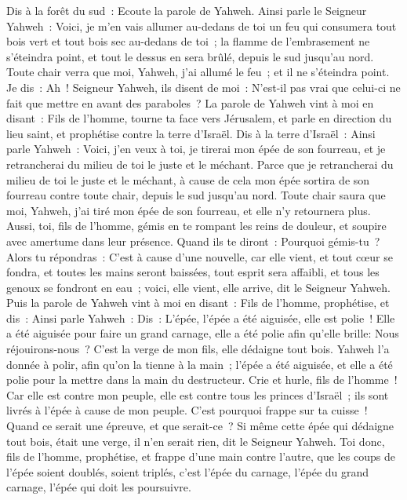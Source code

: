 \begin{multicols}{2}
Dis à la forêt du sud~: Ecoute la parole de Yahweh. Ainsi parle le Seigneur Yahweh~: Voici, je m'en vais allumer au-dedans de toi un feu qui consumera tout bois vert et tout bois sec au-dedans de toi~; la flamme de l'embrasement ne s'éteindra point, et tout le dessus en sera brûlé, depuis le sud jusqu'au nord.
Toute chair verra que moi, Yahweh, j'ai allumé le feu~; et il ne s'éteindra point.
Je dis~: Ah~! Seigneur Yahweh, ils disent de moi~: N'est-il pas vrai que celui-ci ne fait que mettre en avant des paraboles~?
La parole de Yahweh vint à moi en disant~:
Fils de l'homme, tourne ta face vers Jérusalem, et parle en direction du lieu saint, et prophétise contre la terre d'Israël.
Dis à la terre d'Israël~: Ainsi parle Yahweh~: Voici, j'en veux à toi, je tirerai mon épée de son fourreau, et je retrancherai du milieu de toi le juste et le méchant.
Parce que je retrancherai du milieu de toi le juste et le méchant, à cause de cela mon épée sortira de son fourreau contre toute chair, depuis le sud jusqu'au nord.
Toute chair saura que moi, Yahweh, j'ai tiré mon épée de son fourreau, et elle n'y retournera plus.
Aussi, toi, fils de l'homme, gémis en te rompant les reins de douleur, et soupire avec amertume dans leur présence.
Quand ils te diront~: Pourquoi gémis-tu~? Alors tu répondras~: C'est à cause d'une nouvelle, car elle vient, et tout cœur se fondra, et toutes les mains seront baissées, tout esprit sera affaibli, et tous les genoux se fondront en eau~; voici, elle vient, elle arrive, dit le Seigneur Yahweh.
Puis la parole de Yahweh vint à moi en disant~:
Fils de l'homme, prophétise, et dis~: Ainsi parle Yahweh~: Dis~: L'épée, l'épée a été aiguisée, elle est polie~!
Elle a été aiguisée pour faire un grand carnage, elle a été polie afin qu'elle brille: Nous réjouirons-nous~? C'est la verge de mon fils, elle dédaigne tout bois.
Yahweh l'a donnée à polir, afin qu'on la tienne à la main~; l'épée a été aiguisée, et elle a été polie pour la mettre dans la main du destructeur.
Crie et hurle, fils de l'homme~! Car elle est contre mon peuple, elle est contre tous les princes d'Israël~; ils sont livrés à l'épée à cause de mon peuple. C'est pourquoi frappe sur ta cuisse~!
Quand ce serait une épreuve, et que serait-ce~? Si même cette épée qui dédaigne tout bois, était une verge, il n'en serait rien, dit le Seigneur Yahweh. 
Toi donc, fils de l'homme, prophétise, et frappe d'une main contre l'autre, que les coups de l'épée soient doublés, soient triplés, c'est l'épée du carnage, l'épée du grand carnage, l'épée qui doit les poursuivre.

\end{multicols}
